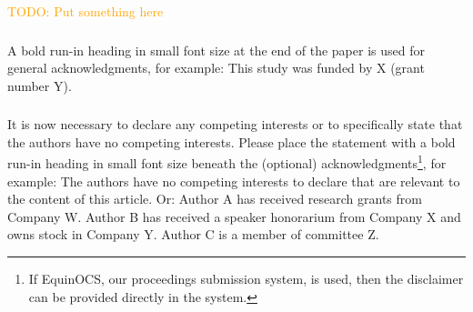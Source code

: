 \documentclass[runningheads]{llncs}
\newcommand{\todo}[1]{\textcolor{orange}{TODO: #1}}
\begin{document}
\begin{credits}
    \todo{Put something here}
\subsubsection{\ackname} A bold run-in heading in small font size at the end of the paper is
used for general acknowledgments, for example: This study was funded
by X (grant number Y).

\subsubsection{\discintname}
It is now necessary to declare any competing interests or to specifically
state that the authors have no competing interests. Please place the
statement with a bold run-in heading in small font size beneath the
(optional) acknowledgments\footnote{If EquinOCS, our proceedings submission
system, is used, then the disclaimer can be provided directly in the system.},
for example: The authors have no competing interests to declare that are
relevant to the content of this article. Or: Author A has received research
grants from Company W. Author B has received a speaker honorarium from
Company X and owns stock in Company Y. Author C is a member of committee Z.
\end{credits}





\end{document}
